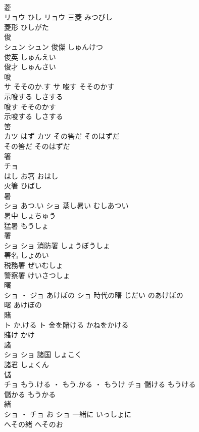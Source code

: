 \documentclass[8pt]{extreport}
\begin{document}
\begin{CJK}{UTF8}{min}
\\	菱	
\\	リョウ	ひし	リョウ	三菱	みつびし	
\\	菱形	ひしがた	
\\	俊	
\\	シュン		シュン	俊傑	しゅんけつ	
\\	俊英	しゅんえい	
\\	俊才	しゅんさい	
\\	唆	
\\	サ	そそのか.す	サ	唆す	そそのかす	
\\	示唆する	しさする	
\\	唆す	そそのかす	
\\	示唆する	しさする	
\\	筈	
\\	カツ	はず	カツ	その筈だ	そのはずだ	
\\	その筈だ	そのはずだ	
\\	箸	
\\	チョ
\\	はし		お箸	おはし	
\\	火箸	ひばし	
\\	暑	
\\	ショ	あつ.い	ショ	蒸し暑い	むしあつい	
\\	暑中	しょちゅう	
\\	猛暑	もうしょ	
\\	署	
\\	ショ		ショ	消防署	しょうぼうしょ	
\\	署名	しょめい	
\\	税務署	ぜいむしょ	
\\	警察署	けいさつしょ	
\\	曙	
\\	ショ ・ ジョ	あけぼの	ショ	時代の曙	じだい のあけぼの	
\\	曙	あけぼの	
\\	賭	
\\	ト	か.ける	ト	金を賭ける	かねをかける	
\\	賭け	かけ	
\\	諸	
\\	ショ		ショ	諸国	しょこく	
\\	諸君	しょくん	
\\	儲	
\\	チョ	もう.ける ・ もう.かる ・ もうけ	チョ	儲ける	もうける	
\\	儲かる	もうかる	
\\	緒	
\\	ショ ・ チョ	お	ショ	一緒に	いっしょに	
\\	へその緒	へそのお	

\end{CJK}
\end{document}
